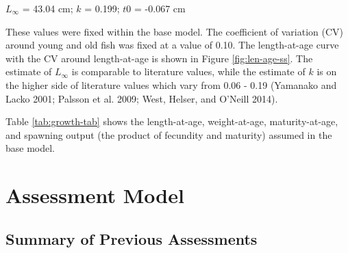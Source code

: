 \documentclass[11pt,
  english,
  a4paper,
]{article}
\begin{document}
\leavevmode\tagmcend\tagstructend\par

\begin{centering}

$L_{\infty}$ = 43.04 cm; $k$ = 0.199; $t0$ = -0.067 cm  

\end{centering}


These values were fixed within the base model. The coefficient of variation (CV) around young and old fish was fixed at a value of 0.10. The length-at-age curve with the CV around length-at-age is shown in Figure \ref{fig:len-age-ss}. The estimate of {\(L_{\infty}\)\leavevmode\tagmcend\tagstructend} is comparable to literature values, while the estimate of {\(k\)\leavevmode\tagmcend\tagstructend} is on the higher side of literature values which vary from 0.06 - 0.19 {(Yamanako and Lacko 2001; Palsson et al. 2009; West, Helser, and O'Neill 2014)\leavevmode\tagmcend\tagstructend}.

\leavevmode\tagmcend\tagstructend\par


Table \ref{tab:growth-tab} shows the length-at-age, weight-at-age, maturity-at-age, and spawning output (the product of fecundity and maturity) assumed in the base model.

\leavevmode\tagmcend\tagstructend\par


\hypertarget{assessment-model}{%
\section{Assessment Model}\label{assessment-model}}

\leavevmode\tagmcend\tagstructend


\hypertarget{summary-of-previous-assessments}{%
\subsection{Summary of Previous Assessments}\label{summary-of-previous-assessments}}
\end{document}

